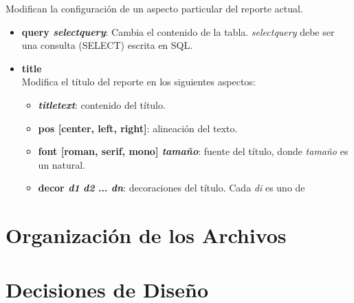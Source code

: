 \documentclass[a4paper,12pt]{article}
\begin{document}
\begin{itemize}
	Modifican la configuración de un aspecto particular del reporte actual.
		\begin{itemize}
		\item \textbf{query \textit{selectquery}}: Cambia el contenido de la tabla. \textit{selectquery} debe ser una consulta (SELECT) escrita en SQL.
		\item \textbf{title}\\
		Modifica el título del reporte en los siguientes aspectos:
			\begin{itemize}
			\item \textbf{\textit{titletext}}: contenido del título.	
			\item \textbf{pos [center, left, right]}: alineación del texto.
			\item \textbf{font [roman, serif, mono] \textit{tamaño}}: fuente del título, donde \textit{tamaño} es un natural.
			\item \textbf{decor \textit{d1} \textit{d2} ... \textit{d{n}}}: decoraciones del título. Cada \textit{d{i}} es uno de %
			\end{itemize}
		\end{itemize}
	\end{itemize}

\section{Organización de los Archivos}

\section{Decisiones de Diseño}
\end{document}
